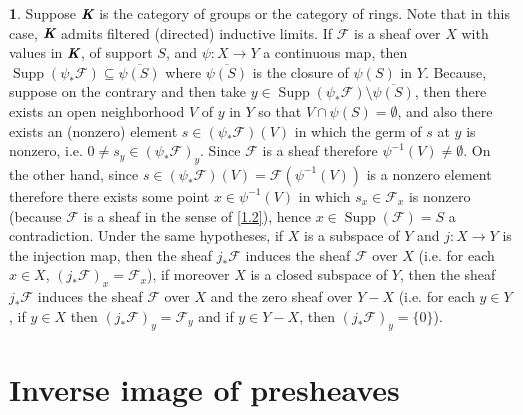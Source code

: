 \documentclass[12pt]{amsart}
\newcommand{\Supp}{\operatorname{Supp}}
\theoremstyle{definition}
\newtheorem{bk}[proposition]{}
\begin{document}
\begin{bk}\label{I: 3.4.6} Suppose $\emph{\textbf{K}}$ is the category of groups or the category of rings. Note that in this case, $\emph{\textbf{K}}$ admits filtered (directed) inductive limits.  If $\mathscr{F}$ is a sheaf over $X$ with values in $\emph{\textbf{K}}$, of support $S$, and $\psi:X\rightarrow Y$ a continuous map, then $\Supp(\psi_{\ast}\mathscr{F})\subseteq\overline{\psi(S)}$ where $\overline{\psi(S)}$ is the closure of $\psi(S)$ in $Y$. Because, suppose on the contrary and then take $y\in\Supp(\psi_{\ast}\mathscr{F})\setminus\overline{\psi(S)}$, then there exists an open neighborhood $V$ of $y$ in $Y$ so that $V\cap\psi(S)=\emptyset$, and also there exists an (nonzero) element $s\in(\psi_{\ast}\mathscr{F})(V)$ in which the germ of $s$ at $y$ is nonzero, i.e. $0\neq s_{y}\in(\psi_{\ast}\mathscr{F})_{y}$. Since $\mathscr{F}$ is a sheaf therefore $\psi^{-1}(V)\neq\emptyset$. On the other hand, since $s\in(\psi_{\ast}\mathscr{F})(V)=\mathscr{F}(\psi^{-1}(V))$ is a nonzero element therefore there exists some point $x\in\psi^{-1}(V)$ in which $s_{x}\in\mathscr{F}_{x}$ is nonzero (because $\mathscr{F}$ is a sheaf in the sense of \ref{1.2}), hence $x\in\Supp(\mathscr{F})=S$ a contradiction.
Under the same hypotheses, if $X$ is a subspace of $Y$ and $j:X\rightarrow Y$ is the injection map, then the sheaf $j_{\ast}\mathscr{F}$ induces the sheaf $\mathscr{F}$ over $X$ (i.e. for each $x\in X$, $(j_{\ast}\mathscr{F})_{x}=\mathscr{F}_{x}$), if moreover $X$ is a closed subspace of $Y$, then the sheaf $j_{\ast}\mathscr{F}$ induces the sheaf $\mathscr{F}$ over $X$ and the zero sheaf over $Y-X$ (i.e. for each $y\in Y$, if $y\in X$ then $(j_{\ast}\mathscr{F})_{y}=\mathscr{F}_{y}$ and if $y\in Y-X$, then $(j_{\ast}\mathscr{F})_{y}=\{0\}$).\\
\end{bk}

\section{Inverse image of presheaves}
\end{document}
